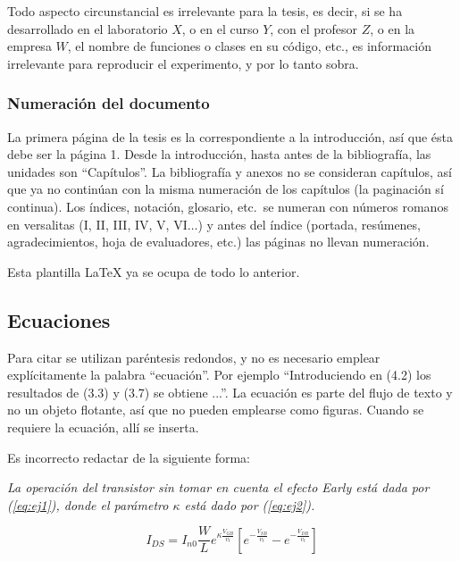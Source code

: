 Todo aspecto circunstancial es irrelevante para la tesis, es decir, si se ha
desarrollado en el laboratorio $X$, o en el curso $Y$, con el profesor $Z$, o
en la empresa $W$, el nombre de funciones o clases en su código, etc., es
información irrelevante para reproducir el experimento, y por lo tanto sobra.

\subsubsection{Numeración del documento}

La primera página de la tesis es la correspondiente a la introducción,
así que ésta debe ser la página 1. Desde la introducción, hasta antes
de la bibliografía, las unidades son ``Capítulos''. La bibliografía y
anexos no se consideran capítulos, así que ya no continúan con la
misma numeración de los capítulos (la paginación sí continua). Los
índices, notación, glosario, etc.\ se numeran con números romanos en
versalitas ({\textsc{I}, \textsc{II}, \textsc{III}, \textsc{IV},
  \textsc{V}, \textsc{VI}}$\ldots$) y antes del índice (portada,
resúmenes, agradecimientos, hoja de evaluadores, etc.) las páginas no
llevan numeración.

Esta plantilla LaTeX ya se ocupa de todo lo anterior.

\subsection{Ecuaciones}

Para citar  se utilizan paréntesis redondos, y no es
necesario emplear explícitamente la palabra ``ecuación''. Por ejemplo
``Introduciendo en (4.2) los resultados de (3.3) y (3.7) se obtiene
...''. La ecuación es parte del flujo de texto y no un objeto
flotante, así que no pueden emplearse como figuras. Cuando se requiere
la ecuación, allí se inserta.

Es incorrecto redactar de la siguiente forma: 

\textsl{La operación del transistor sin tomar en cuenta el efecto Early está
  dada por (\ref{eq:ej1}), donde el parámetro $\kappa$ está dado por
  (\ref{eq:ej2}).}

\begin{equation} \label{eq:ej1}
  I_{DS}
  =
  I_{n0} \frac{W}{L}e^{\kappa \frac{V_{GB}}{v_t}}
  \left[
    e^{-\frac{V_{SB}}{v_t}}
    -
    e^{-\frac{V_{DB}}{v_t}}
  \right]
\end{equation}

